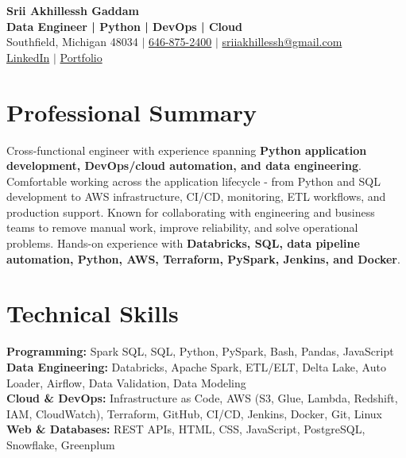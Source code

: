 \documentclass[letterpaper,10pt]{article}
\begin{document}
\fontsize{9.35pt}{10.45pt}\selectfont

\begin{center}
    {\LARGE \textbf{Srii Akhillessh Gaddam}} \\[-1pt]
    \textbf{Data Engineer | Python | DevOps | Cloud} \\[2pt]
    Southfield, Michigan 48034 $|$
    \href{tel:6468752400}{646-875-2400} $|$
    \href{mailto:sriiakhillessh@gmail.com}{sriiakhillessh@gmail.com} \\[1pt]
    \href{https://www.linkedin.com/in/srii-akhiilessh-gaddam-b48668191/}{LinkedIn} $|$
    \href{https://sriiakhillesshg.github.io/portfolio/}{Portfolio}
\end{center}
\vspace{-8pt}

\section{Professional Summary}
\small{Cross-functional engineer with experience spanning \textbf{Python application development, DevOps/cloud automation, and data engineering}. Comfortable working across the application lifecycle - from Python and SQL development to AWS infrastructure, CI/CD, monitoring, ETL workflows, and production support. Known for collaborating with engineering and business teams to remove manual work, improve reliability, and solve operational problems. Hands-on experience with \textbf{Databricks, SQL, data pipeline automation, Python, AWS, Terraform, PySpark, Jenkins, and Docker}.}

\section{Technical Skills}
\small{
\textbf{Programming:} Spark SQL, SQL, Python, PySpark, Bash, Pandas, JavaScript \\
\textbf{Data Engineering:} Databricks, Apache Spark, ETL/ELT, Delta Lake, Auto Loader, Airflow, Data Validation, Data Modeling \\
\textbf{Cloud \& DevOps:} Infrastructure as Code, AWS (S3, Glue, Lambda, Redshift, IAM, CloudWatch), Terraform, GitHub, CI/CD, Jenkins, Docker, Git, Linux \\
\textbf{Web \& Databases:} REST APIs, HTML, CSS, JavaScript, PostgreSQL, Snowflake, Greenplum
}
\end{document}
